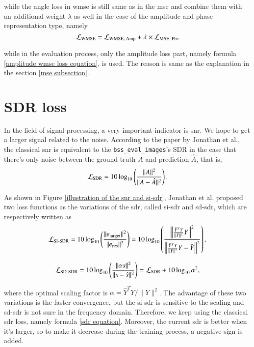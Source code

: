 while the angle loss in \gls{wmse} is still same as in the \gls{mse} and combine them with an additional weight $\lambda$ as well in the case of the amplitude and phase representation type, namely
\begin{equation}
    \centering
    \mathcal{L}_{\text{WMSE}} = \mathcal{L}_{\text{WMSE, Amp}} + \lambda \times \mathcal{L}_{\text{MSE, Ph}},
\end{equation}

while in the evaluation process, only the amplitude loss part, namely formula \ref{amplitude wmse loss equation}, is used. The reason is same as the explanation in the section \ref{mse subsection}.

\section{SDR loss} \label{sdr loss}
In the field of signal processing, a very important indicator is \gls{snr}. We hope to get a larger signal related to the noise. According to the paper \cite{roux_sdr_2018} by Jonathan et al., the classical \gls{snr} is equivalent to the \texttt{bss\_eval\_images}’s SDR in the case that there's only noise between the ground truth $A$ and prediction $\hat{A}$, that is, 
\begin{equation}
    \centering
    \mathcal{L}_{\text{SDR}} = 10 \log_{10} \left( \frac{\|A\|^2}{\|A - \hat{A}\|^2} \right).
    \label{sdr equation}
\end{equation}

As shown in Figure \ref{illustration of the snr and si-sdr}, Jonathan et al. proposed two loss functions as the variations of the \gls{sdr}, called \gls{si-sdr} and \gls{sd-sdr}, which are respectively written as
\begin{equation}
    \centering
    \mathcal{L}_{\text{SI-SDR}} = 10 \log_{10} \left( \frac{\| e_{\text{target}} \|^2}{\| e_{\text{res}} \|^2} \right) = 10 \log_{10} \left(\frac{\left\| \frac{\hat{Y}^{T} Y}{\|Y\|^2} Y \right\|^2}{\left\| \frac{\hat{Y}^{T} Y}{\|Y\|^2} Y - \hat{Y} \right\|^2}\right),
\end{equation}

\begin{equation}
    \centering
    \mathcal{L}_{\text{SD-SDR}} = 10 \log_{10} \left( \frac{\|\alpha s\|^2}{\|s - \hat{s}\|^2} \right) = \mathcal{L}_{\text{SDR}} + 10 \log_{10} \alpha^2,
\end{equation}

where the optimal scaling factor is $\alpha = \hat{Y}^{T} Y / \|Y\|^2$. The advantage of these two variations is the faster convergence, but the \gls{si-sdr} is sensitive to the scaling and \gls{sd-sdr} is not sure in the frequency domain. Therefore, we keep using the classical \gls{sdr} loss, namely formula \ref{sdr equation}. Moreover, the current \gls{sdr} is better when it's larger, so to make it decrease during the training process, a negative sign is added.

